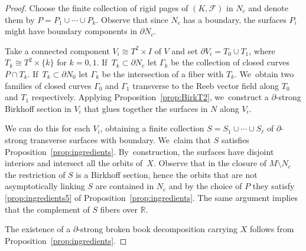 \documentclass[JEP,XML,SOM,Unicode,NoEqCountersInSection,NoFloatCountersInSection,published]{cedram}
\theoremstyle{definition}
\begin{document}
\begin{proof}
Choose the finite collection of rigid pages of $(K,\mathcal{F})$ in $N_c$ and denote them by $P=P_1\cup \cdots \cup P_k$. Observe that since $N_c$ has a boundary, the surfaces $P_i$ might have boundary components in $\partial N_c$.

Take a connected component $V_i\cong T^2\times I$ of $V$ and set $\partial V_i=T_0\cup T_1$, where $T_k\cong T^2\times \{k\}$ for $k=0,1$. If~$T_k \subset \partial N_c$ let $\Gamma_k$ be the collection of closed curves $P\cap T_k$. If~$T_k\subset \partial N_0$ let $\Gamma_k$ be the intersection of a fiber with $T_k$. We~obtain two families of closed curves $\Gamma_0$ and $\Gamma_1$ transverse to the Reeb vector field along $T_0$ and $T_1$ respectively. Applying Proposition~\ref{prop:BirkT2}, we~construct a $\partial$-strong Birkhoff section in $V_i$ that glues together the surfaces in $N$ along $V_i$.

We can do this for each $V_i$, obtaining a finite collection $S=S_1\cup\cdots \cup S_\ell$ of $\partial$\nobreakdash-strong transverse surfaces with boundary. We~claim that $S$ satisfies Proposition~\ref{prop:ingredients}. By~construction, the surfaces have disjoint interiors and intersect all the orbits of~$X$. Observe that in the closure of $M\setminus N_c$ the restriction of $S$ is a Birkhoff section, hence the orbits that are not asymptotically linking $S$ are contained in $N_c$ and by the choice of $P$ they satisfy \eqref{prop:ingredients5} of Proposition~\ref{prop:ingredients}. The same argument implies that the complement of $S$ fibers over $\mathbb{R}$.

The existence of a $\partial$-strong broken book decomposition carrying $X$ follows from Proposition~\ref{prop:ingredients}.


\end{proof}
\end{document}
